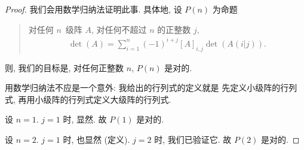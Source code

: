 \documentclass[../libro.tex]{subfiles}
\begin{document}
\begin{proof}
    我们会用数学归纳法证明此事.
    具体地, 设 \(P(n)\) 为命题
    \begin{quotation}
        对任何 \(n\)~级阵 \(A\),
        对任何不超过 \(n\) 的正整数 \(j\),
        \begin{align*}
            \det {(A)}
            = \sum_{i = 1}^{n} {(-1)^{i+j} [A]_{i,j} \det {(A(i|j))}}.
        \end{align*}
    \end{quotation}
    则, 我们的目标是,
    对任何正整数 \(n\), \(P(n)\) 是对的.

    用数学归纳法不应是一个意外:
    我给出的行列式的定义就是%
    先定义小级阵的行列式,
    再用小级阵的行列式定义大级阵的行列式.

    设 \(n = 1\).
    \(j = 1\) 时, 显然.
    故 \(P(1)\) 是对的.

    设 \(n = 2\).
    \(j = 1\) 时, 也显然 (定义).
    \(j = 2\) 时, 我们已验证它.
    故 \(P(2)\) 是对的.


\end{proof}
\end{document}
